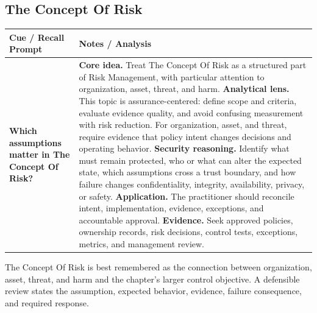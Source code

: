 \documentclass[11pt]{article}
\newcommand{\CornellHeader}{%
\rowcolor{Navy}\color{white}\bfseries Cue / Recall Prompt & \color{white}\bfseries Notes / Analysis\\\hline}
\newcommand{\CornellRow}[2]{%
\cellcolor{CueGray}\RaggedRight\textbf{#1} & \RaggedRight #2\\\hline}
\begin{document}
\subsection*{The Concept Of Risk}
\begin{longtable}{>{\RaggedRight\arraybackslash}p{}|>{\RaggedRight\arraybackslash}p{}}
\CornellHeader
\CornellRow{Which assumptions matter in The Concept Of Risk?}{\textbf{Core idea.} Treat The Concept Of Risk as a structured part of Risk Management, with particular attention to organization, asset, threat, and harm. \textbf{Analytical lens.} This topic is assurance-centered: define scope and criteria, evaluate evidence quality, and avoid confusing measurement with risk reduction. For organization, asset, and threat, require evidence that policy intent changes decisions and operating behavior. \textbf{Security reasoning.} Identify what must remain protected, who or what can alter the expected state, which assumptions cross a trust boundary, and how failure changes confidentiality, integrity, availability, privacy, or safety. \textbf{Application.} The practitioner should reconcile intent, implementation, evidence, exceptions, and accountable approval. \textbf{Evidence.} Seek approved policies, ownership records, risk decisions, control tests, exceptions, metrics, and management review.}
\end{longtable}
\begin{topicsummary}
The Concept Of Risk is best remembered as the connection between organization, asset, threat, and harm and the chapter's larger control objective. A defensible review states the assumption, expected behavior, evidence, failure consequence, and required response.
\end{topicsummary}
\end{document}
